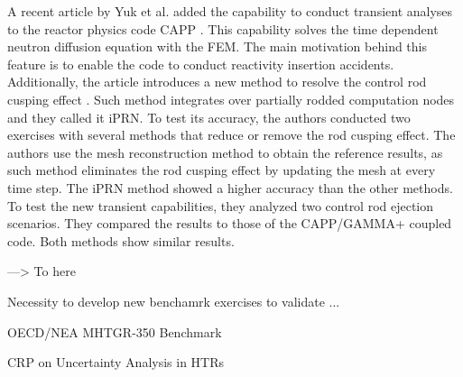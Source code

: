 \documentclass[11pt,letterpaper]{article}
\begin{document}
A recent article by Yuk et al. \cite{yuk_time-dependent_2020} added the capability to conduct transient analyses to the reactor physics code CAPP \cite{lee_development_2011}.
This capability solves the time dependent neutron diffusion equation with the \gls{FEM}.
The main motivation behind this feature is to enable the code to conduct reactivity insertion accidents.
Additionally, the article introduces a new method to resolve the control rod cusping effect \cite{joo_resolution_1984}.
Such method integrates over partially rodded computation nodes and they called it iPRN.
To test its accuracy, the authors conducted two exercises with several methods that reduce or remove the rod cusping effect.
The authors use the mesh reconstruction method to obtain the reference results, as such method eliminates the rod cusping effect by updating the mesh at every time step.
The iPRN method showed a higher accuracy than the other methods.
To test the new transient capabilities, they analyzed two control rod ejection scenarios.
They compared the results to those of the CAPP/GAMMA+ coupled code.
Both methods show similar results.

---> To here

Necessity to develop new benchamrk exercises to validate ...

OECD/NEA MHTGR-350 Benchmark

CRP on Uncertainty Analysis in HTRs





\pagebreak


\end{document}
